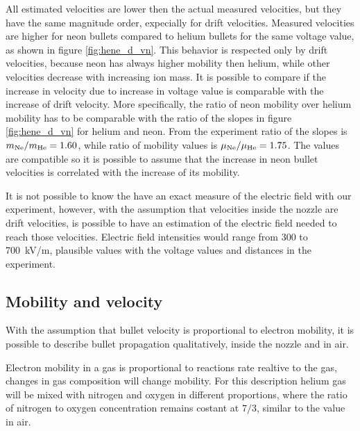  
All estimated velocities are lower then the actual measured velocities, but they have the same magnitude order, expecially for drift velocities.
Measured velocities are higher for neon bullets compared to helium bullets for the same voltage value, as shown in figure \ref{fig:hene_d_vn}. This behavior is respected only by drift velocities, because neon has always higher mobility then helium, while other velocities decrease with increasing ion mass.
It is possible to compare if the increase in velocity due to increase in voltage value is comparable with the increase of drift velocity. More specifically, the ratio of neon mobility over helium mobility has to be comparable with the ratio of the slopes in figure \ref{fig:hene_d_vn} for helium and neon. From the experiment ratio of the slopes is $m_{\ce{Ne}}/m_{\ce{He}} = \num{1.60}$, while ratio of mobility values is $\mu_{\ce{Ne}}/\mu_{\ce{He}} = \num{1.75}$. The values are compatible so it is possible to assume that the increase in neon bullet velocities is correlated with the increase of its mobility.

It is not possible to know the have an exact measure of the electric field with our experiment, however, with the assumption that velocities inside the nozzle are drift velocities, is possible to have an estimation of the electric field needed to reach those velocities. Electric field intensities would range from \num{300} to \SI{700}{\kilo\volt/\meter}, plausible values with the voltage values and distances in the experiment.

\subsection{Mobility and velocity}
With the assumption that bullet velocity is proportional to electron mobility, it is possible to describe bullet propagation qualitatively, inside the nozzle and in air.

Electron mobility in a gas is proportional to reactions rate realtive to the gas, changes in gas composition will change mobility. For this description helium gas will be mixed with nitrogen and oxygen in different proportions, where the ratio of nitrogen to oxygen concentration remains costant at $7/3$, similar to the value in air.

